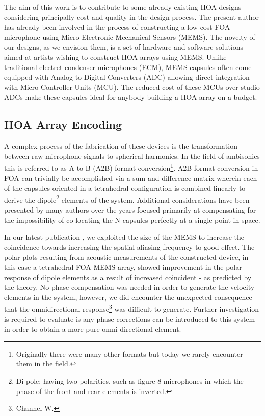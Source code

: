 The aim of this work is to contribute to some already existing HOA designs considering principally cost and quality in the design process. The present author has already been involved in the process of constructing a low-cost FOA microphone using Micro-Electronic Mechanical Sensors (MEMS). The novelty of our designs, as we envision them, is a set of hardware and software solutions aimed at artists wishing to construct HOA arrays using MEMS. Unlike traditional electret condenser microphones (ECM), MEMS capsules often come equipped with Analog to Digital Converters (ADC) allowing direct integration with Micro-Controller Units (MCU). The reduced cost of these MCUs over studio ADCs make these capsules ideal for anybody building a HOA array on a budget. 
\subsection{HOA Array Encoding}

A complex process of the fabrication of these devices is the transformation between raw microphone signals to spherical harmonics. In the field of ambisonics this is referred to as A to B (A2B) format conversion\footnote{Originally there were many other formats but today we rarely encounter them in the field.}. A2B format conversion in FOA can trivially be accomplished via a sum-and-difference matrix wherein each of the capsules oriented in a tetrahedral configuration is combined linearly to derive the dipole\footnote{Di-pole: having two polarities, such as figure-8 microphones in which the phase of the front and rear elements is inverted.} elements of the system. Additional considerations have been presented by many authors over the years focused primarily at compensating for the impossibility of co-locating the N capsules perfectly at a single point in space.

In our latest publication \cite{zalles2019effects}, we exploited the size of the MEMS to increase the coincidence towards increasing the spatial aliasing frequency to good effect. The polar plots resulting from acoustic measurements of the constructed device, in this case a tetrahedral FOA MEMS array, showed improvement in the polar response of dipole elements as a result of increased coincident - as predicted by the theory. No phase compensation was needed in order to generate the velocity elements in the system, however, we did encounter the unexpected consequence that the omnidirectional response\footnote{Channel W.} was difficult to generate. Further investigation is required to evaluate is any phase corrections can be introduced to this system in order to obtain a more pure omni-directional element.


